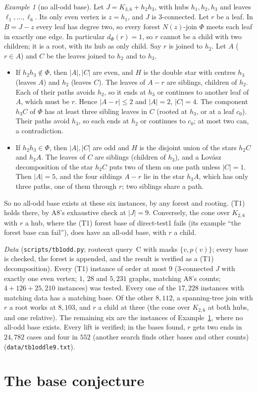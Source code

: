 \documentclass[11pt]{amsart}
\theoremstyle{definition}
\theoremstyle{remark}
\newtheorem{example}[theorem]{Example}
\renewcommand{\_}{\oldunderscore\allowbreak}
\newcommand{\TONEDATA}{Every (T1) instance of order at most $9$ ($3$-connected $J$ with exactly one
even vertex; $1$, $28$ and $5{,}231$ graphs, matching A8's counts; $4+126+25{,}210$ instances) was
tested. Every one of the $17{,}228$ instances with matching data has a matching base. Of the
other $8{,}112$, a spanning-tree join with $r$ a root works at $8{,}103$, and $r$ a child at three
(the cone over $K_{2,6}$ at both hubs, and one relative). The remaining six are the instances of
Example~\ref{ex:t1theta}, where no all-odd base exists. Every lift is verified; in the bases found,
$r$ gets two ends in $24{,}782$ cases and four in $552$ (another search finds other bases and other
counts) (\texttt{data/tb1\_odd\_le9.txt})}
\begin{document}
\begin{example}[no all-odd base]\label{ex:t1theta}
Let $J=K_{3,6}+h_2h_3$, with hubs $h_1,h_2,h_3$ and leaves $\ell_1,\dots,\ell_6$. Its only even
vertex is $z=h_1$, and $J$ is $3$-connected. Let $r$ be a leaf. In $B=J-z$ every leaf has degree
two, so every forest $N(z)$-join $\Phi$ meets each leaf in exactly one edge. In particular
$d_\Phi(r)=1$, so $r$ cannot be a child with two children; it is a root, with its hub as only child.
Say $r$ is joined to $h_2$. Let $A$ ($r\in A$) and $C$ be the leaves joined to $h_2$ and to $h_3$.
\begin{itemize}[leftmargin=*]
\item If $h_2h_3\notin\Phi$, then $|A|,|C|$ are even, and $H$ is the double star with centres
$h_3$ (leaves $A$) and $h_2$ (leaves $C$). The leaves of $A-r$ are siblings, children of $h_2$. Each
of their paths avoids $h_2$, so it ends at $h_3$ or continues to another leaf of $A$, which must be
$r$. Hence $|A-r|\le2$ and $|A|=2$, $|C|=4$. The component $h_3C$ of $\Phi$ has at least three
sibling leaves in $C$ (rooted at $h_3$, or at a leaf $c_0$). Their paths avoid $h_3$, so each ends
at $h_2$ or continues to $c_0$; at most two can, a contradiction.
\item If $h_2h_3\in\Phi$, then $|A|,|C|$ are odd and $H$ is the disjoint union of the stars
$h_2C$ and $h_3A$. The leaves of $C$ are siblings (children of $h_3$), and a Lov\'asz decomposition
of the star $h_2C$ puts two of them on one path unless $|C|=1$. Then $|A|=5$, and the four siblings
$A-r$ lie in the star $h_3A$, which has only three paths, one of them through $r$; two
siblings share a path.
\end{itemize}
So no all-odd base exists at these six instances, by any forest and rooting. (T1) holds there, by
A8's exhaustive check at $|J|=9$. Conversely, the cone over $K_{2,6}$ with $r$ a hub, where the
(T1) forest base of direct-test1 fails (its example ``the forest base can fail''), does have an
all-odd base, with $r$ a child.
\end{example}

\emph{Data} (\texttt{scripts/tb1\_odd.py}; route\_ext query~C with masks $\{v,p(v)\}$; every base is
checked, the forest is appended, and the result is verified as a (T1) decomposition). \TONEDATA.

\section{The base conjecture}\label{sec:conj}
\end{document}

